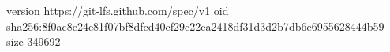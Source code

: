 version https://git-lfs.github.com/spec/v1
oid sha256:8f0ac8e24c81f07bf8dfcd40cf29c22ea2418df31d3d2b7db6e6955628444b59
size 349692
